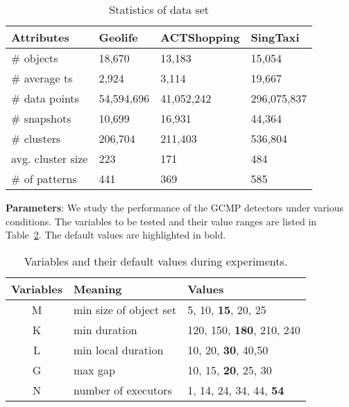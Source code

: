 \begin{table} [h]
\center
\small
\begin{tabular}{|l|l|l|l|}
\hline
 \textbf{Attributes}& \textbf{Geolife} & \textbf{ACTShopping} & \textbf{SingTaxi} \\ 
\hline 
\# objects & 18,670 & 13,183 & 15,054\\ 
\hline
\# average ts & 2,924 & 3,114 & 19,667 \\ 
\hline
\# data points & 54,594,696 & 41,052,242 & 296,075,837\\ 
\hline
\# snapshots & 10,699 & 16,931 & 44,364\\ 
\hline
\# clusters & 206,704 & 211,403 & 536,804\\
\hline
avg. cluster size & 223 & 171 & 484\\
\hline
\# of patterns & 441 & 369 & 585 \\
\hline
\end{tabular}
\caption{Statistics of data set}
\label{exp:dataset}
\end{table}

\textbf{Parameters}: We study the performance of 
the GCMP detectors under various conditions. The variables
to be tested and their value ranges are listed in Table~\ref{tbl:parameters}. 
The default values are highlighted in bold.
\begin{table}[h]
\small
\begin{tabular}{c|l|l}
\hline 
\textbf{Variables} & \textbf{Meaning} & \textbf{Values} \\ 
\hline 
M & min size of object set &  5, 10,  \textbf{15}, 20, 25 \\ 
\hline 
K & min duration & 120, 150, \textbf{180}, 210, 240 \\ 
\hline 
L & min local duration & 10, 20, \textbf{30}, 40,50 \\ 
\hline 
G & max gap & 10, 15, \textbf{20}, 25, 30 \\ 
\hline
N & number of executors & 1, 14, 24, 34, 44, \textbf{54}\\ 
\hline 
\end{tabular} 
\caption{Variables and their default values during experiments.}
\label{tbl:parameters}
\end{table}

